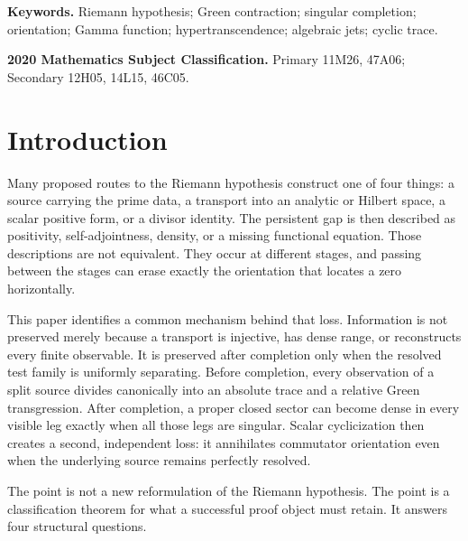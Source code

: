 \documentclass[11pt]{article}
\theoremstyle{definition}
\theoremstyle{remark}
\begin{document}
\begin{abstract}
The arithmetic Calder\'on--Witt source, based infinite algebraic jets, Gamma
canonical products, Bohr and ordered-pulse tomography, Stokes rigidity, and
cyclic orientation loss become native realizations of the same factorization
law.  The Riemann consequence is not another divisor equivalence: every
successful route must construct a source-derived orientation-complete factor;
completed prime-normal routes must make it nonlocal and beyond every finite
Rees order.  No zero-exclusion assertion is assumed or claimed.
\end{abstract}

\medskip
\noindent\textbf{Keywords.}
Riemann hypothesis; Green contraction; singular completion; orientation;
Gamma function; hypertranscendence; algebraic jets; cyclic trace.

\medskip
\noindent\textbf{2020 Mathematics Subject Classification.}
Primary 11M26, 47A06; Secondary 12H05, 14L15, 46C05.

\section{Introduction}

Many proposed routes to the Riemann hypothesis construct one of four things:
a source carrying the prime data, a transport into an analytic or Hilbert
space, a scalar positive form, or a divisor identity.  The persistent gap is
then described as positivity, self-adjointness, density, or a missing
functional equation.  Those descriptions are not equivalent.  They occur at
different stages, and passing between the stages can erase exactly the
orientation that locates a zero horizontally.

This paper identifies a common mechanism behind that loss.  Information is
not preserved merely because a transport is injective, has dense range, or
reconstructs every finite observable.  It is preserved after completion
only when the resolved test family is uniformly separating.  Before
completion, every observation of a split source divides canonically into an
absolute trace and a relative Green transgression.  After completion, a
proper closed sector can become dense in every visible leg exactly when all
those legs are singular.  Scalar cyclicization then creates a second,
independent loss: it annihilates commutator orientation even when the
underlying source remains perfectly resolved.

The point is not a new reformulation of the Riemann hypothesis.  The point is
a classification theorem for what a successful proof object must retain.
It answers four structural questions.
\end{document}
